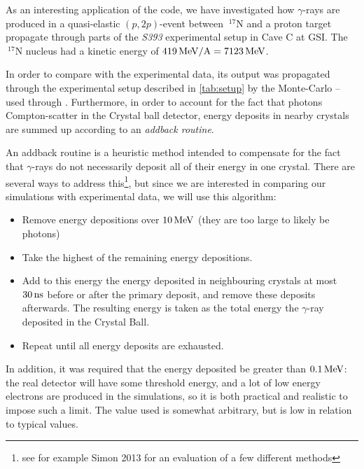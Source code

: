 As an interesting application of the code, we have investigated how $\gamma$-rays are produced in a quasi-elastic $(p,2p)$-event between $~^{17}\mathrm{N}$ and a proton target propagate through parts of the \emph{S393} experimental setup in Cave C at GSI. The $~^{17}\mathrm{N}$ nucleus had a kinetic energy of $\unit[419]{MeV/A} = \unit[7123]{MeV}$.

In order to compare \codename{} with the experimental data, its output was propagated through the experimental setup described in \autoref{tab:setup} by the Monte-Carlo  -- used through .
Furthermore, in order to account for the fact that photons Compton-scatter in the Crystal ball detector, energy deposits in nearby crystals are summed up according to an \emph{addback routine}. 

An addback routine is a heuristic method intended to compensate for the fact that $\gamma$-rays do not necessarily deposit all of their energy in one crystal. There are several ways to address this\footnote{see for example Simon 2013\cite{simon:2013:thesis} for an evaluation of a few different methods}, but since we are interested in comparing our simulations with experimental data, we will use this algorithm:
\begin{itemize}
\item Remove energy depositions over $\unit[10]{MeV}$ (they are too large to likely be photons)
\item Take the highest of the remaining energy depositions.
\item Add to this energy the energy deposited in neighbouring crystals at most $\unit[30]{ns}$ before or after the primary deposit, and remove these deposits afterwards. The resulting energy is taken as the total energy the $\gamma$-ray deposited in the Crystal Ball.
\item Repeat until all energy deposits are exhausted.
\end{itemize}
In addition, it was required that the energy deposited be greater than $\unit[0.1]{MeV}$: the real detector will have some threshold energy, and a lot of low energy electrons are produced in the simulations, so it is both practical and realistic to impose such a limit. The value used is somewhat arbitrary, but is low in relation to typical values.

